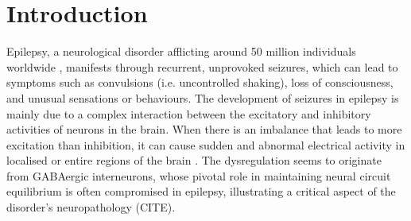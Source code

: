 \documentclass[10pt]{article}
\begin{document}
\begin{sloppypar}
  \begin{abstract}
  \end{abstract}

  \pagebreak
  \tableofcontents
  \pagebreak
  \listoffigures
  \pagebreak


  \section{Introduction}
  \label{sec:introduction}

  Epilepsy, a neurological disorder afflicting around 50 million individuals worldwide \citep{world2019epilepsy}, manifests through recurrent, unprovoked seizures, which can lead to symptoms such as convulsions (i.e. uncontrolled shaking), loss of consciousness, and unusual sensations or behaviours. The development of seizures in epilepsy is mainly due to a complex interaction between the excitatory and inhibitory activities of neurons in the brain. When there is an imbalance that leads to more excitation than inhibition, it can cause sudden and abnormal electrical activity in localised or entire regions of the brain \citep{robinson_propagation_1997}. The dysregulation seems to originate from GABAergic interneurons, whose pivotal role in maintaining neural circuit equilibrium is often compromised in epilepsy, illustrating a critical aspect of the disorder's neuropathology (CITE).


\end{sloppypar}
\end{document}
